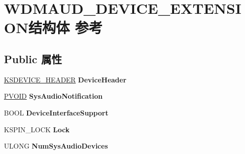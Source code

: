 \hypertarget{struct_w_d_m_a_u_d___d_e_v_i_c_e___e_x_t_e_n_s_i_o_n}{}\section{W\+D\+M\+A\+U\+D\+\_\+\+D\+E\+V\+I\+C\+E\+\_\+\+E\+X\+T\+E\+N\+S\+I\+O\+N结构体 参考}
\label{struct_w_d_m_a_u_d___d_e_v_i_c_e___e_x_t_e_n_s_i_o_n}
\subsection*{Public 属性}
\begin{DoxyCompactItemize}
\item 
\mbox{\label{struct_w_d_m_a_u_d___d_e_v_i_c_e___e_x_t_e_n_s_i_o_n_ac5a7f0c27d9e0978f0ed2e1a63cd9719}} 
\hyperlink{interfacevoid}{K\+S\+D\+E\+V\+I\+C\+E\+\_\+\+H\+E\+A\+D\+ER} {\bfseries Device\+Header}
\item 
\mbox{\label{struct_w_d_m_a_u_d___d_e_v_i_c_e___e_x_t_e_n_s_i_o_n_a8974a5c264be830b0c9ed7e485211fd4}} 
\hyperlink{interfacevoid}{P\+V\+O\+ID} {\bfseries Sys\+Audio\+Notification}
\item 
\mbox{\label{struct_w_d_m_a_u_d___d_e_v_i_c_e___e_x_t_e_n_s_i_o_n_af09d52e163e895922a0c2578397fc539}} 
B\+O\+OL {\bfseries Device\+Interface\+Support}
\item 
\mbox{\label{struct_w_d_m_a_u_d___d_e_v_i_c_e___e_x_t_e_n_s_i_o_n_a4928bdf610eed409ca723b2ff5b2bbf7}} 
K\+S\+P\+I\+N\+\_\+\+L\+O\+CK {\bfseries Lock}
\item 
\mbox{\label{struct_w_d_m_a_u_d___d_e_v_i_c_e___e_x_t_e_n_s_i_o_n_ab5e1b507148dd9b772b4b305c25ed3b3}} 
U\+L\+O\+NG {\bfseries Num\+Sys\+Audio\+Devices}
\item 
\mbox{\label{struct_w_d_m_a_u_d___d_e_v_i_c_e___e_x_t_e_n_s_i_o_n_a0341b98806ef205d5b3ff2068d86e8e0}} 

\end{DoxyCompactItemize}

